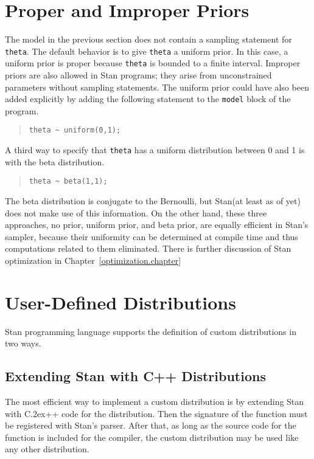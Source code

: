 \documentclass[10pt]{report}
\newcommand{\Stan}{Stan\xspace}
\newcommand*{\Cpp}{C\raise.2ex\hbox{\footnotesize ++}\xspace} %
\newcommand{\code}[1]{{\tt #1}}
\newcommand{\refchapter}[1]{Chapter~\ref{#1.chapter}}
\begin{document}
\section{Proper and Improper Priors}

The model in the previous section does not contain a sampling
statement for \code{theta}.  The default behavior is to give
\code{theta} a uniform prior.  In this case, a uniform prior is proper
because \code{theta} is bounded to a finite interval.  Improper priors
are also allowed in \Stan programs; they arise from unconstrained
parameters without sampling statements.  The uniform prior could have
also been added explicitly by adding the following statement to the
\code{model} block of the program.
%
\begin{quote}
\begin{Verbatim} 
theta ~ uniform(0,1);
\end{Verbatim}
\end{quote}
% 
A third way to specify that \code{theta} has a uniform distribution
between 0 and 1 is with the beta distribution.
%
\begin{quote}
\begin{Verbatim}
theta ~ beta(1,1);
\end{Verbatim}
\end{quote}
%
The beta distribution is conjugate to the Bernoulli, but \Stan (at
least as of yet) does not make use of this information.  On the other hand,
these three approaches, no prior, uniform prior, and beta prior,
are equally efficient in \Stan's sampler, because their uniformity
can be determined at compile time and thus computations related to
them eliminated.  There is further discussion of \Stan optimization
in \refchapter{optimization}




\section{User-Defined Distributions}

\Stan programming language supports the definition of custom
distributions in two ways.  

\subsection{Extending \Stan with C++ Distributions}

The most efficient way to implement a custom distribution is by
extending \Stan with \Cpp code for the distribution.  Then the
signature of the function must be registered with \Stan's parser.
After that, as long as the source code for the function is included
for the compiler, the custom distribution may be used like any other
distribution.
\end{document}
